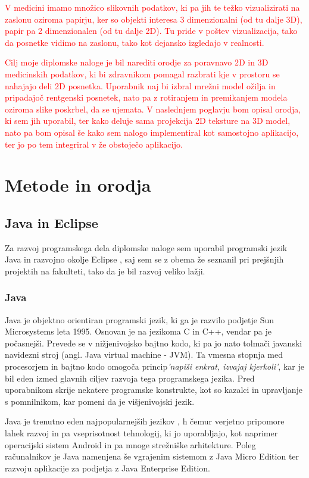 \documentclass[a4paper, 12pt]{book}
\begin{document}
\textcolor{red}{V medicini imamo množico slikovnih podatkov, ki pa jih te težko vizualizirati na zaslonu oziroma papirju, ker so objekti interesa 3 dimenzionalni (od tu dalje 3D), papir pa 2 dimenzionalen (od tu dalje 2D). Tu pride v poštev vizualizacija, tako da posnetke vidimo na zaslonu, tako kot dejansko izgledajo v realnosti.}

\textcolor{red}{Cilj moje diplomske naloge je bil narediti orodje za poravnavo 2D in 3D medicinskih podatkov, ki bi zdravnikom pomagal razbrati kje v prostoru se nahajajo deli 2D posnetka. Uporabnik naj bi izbral mrežni model ožilja in pripadajoč rentgenski posnetek, nato pa z rotiranjem in premikanjem modela oziroma slike poskrbel, da se ujemata. V naslednjem poglavju bom opisal orodja, ki sem jih uporabil, ter kako deluje sama projekcija 2D teksture na 3D model, nato pa bom opisal še kako sem nalogo implementiral kot samostojno aplikacijo, ter jo po tem integriral v že obstoječo aplikacijo.}

\chapter{Metode in orodja}
\section{Java in Eclipse}
Za razvoj programskega dela diplomske naloge sem uporabil programski jezik Java \cite{Java} in razvojno okolje Eclipse \cite{Eclipse}, saj sem se z obema že seznanil pri prejšnjih projektih na fakulteti, tako da je bil razvoj veliko lažji.
\subsection*{Java}
Java je objektno orientiran programski jezik, ki ga je razvilo podjetje Sun Microsystems leta 1995. Osnovan je na jezikoma C in C++, vendar pa je počasnejši. Prevede se v nižjenivojsko bajtno kodo, ki pa jo nato tolmači javanski navidezni stroj (angl. Java virtual machine - JVM). Ta vmesna stopnja med procesorjem in bajtno kodo omogoča princip\emph{'napiši enkrat, izvajaj kjerkoli'}, kar je bil eden izmed glavnih ciljev razvoja tega programskega jezika. Pred uporabnikom skrije nekatere programske konstrukte, kot so kazalci in upravljanje s pomnilnikom, kar pomeni da je višjenivojski jezik. 

Java je trenutno eden najpopularnejših jezikov \cite{javapopularity}, h čemur verjetno pripomore lahek razvoj in pa vseprisotnost tehnologij, ki jo uporabljajo, kot naprimer operacijski sistem Android in pa mnoge strežniške arhitekture. Poleg računalnikov je Java namenjena še vgrajenim sistemom z Java Micro Edition ter razvoju aplikacije za podjetja z Java Enterprise Edition.
\end{document}
